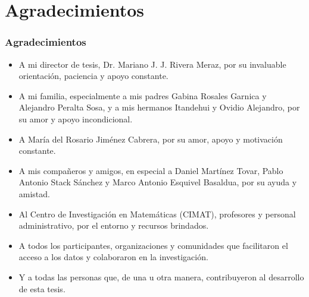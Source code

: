 
\section{Agradecimientos}

\begin{frame}
\frametitle{Agradecimientos}
\begin{itemize}
    \item A mi director de tesis, Dr. Mariano J. J. Rivera Meraz, por su invaluable orientación, paciencia y apoyo constante.
    \item A mi familia, especialmente a mis padres Gabina Rosales Garnica y Alejandro Peralta Sosa, y a mis hermanos Itandehui y Ovidio Alejandro, por su amor y apoyo incondicional.
    \item A María del Rosario Jiménez Cabrera, por su amor, apoyo y motivación constante.
    \item A mis compañeros y amigos, en especial a Daniel Martínez Tovar, Pablo Antonio Stack Sánchez y Marco Antonio Esquivel Basaldua, por su ayuda y amistad.
    \item Al Centro de Investigación en Matemáticas (CIMAT), profesores y personal administrativo, por el entorno y recursos brindados.
    \item A todos los participantes, organizaciones y comunidades que facilitaron el acceso a los datos y colaboraron en la investigación.
    \item Y a todas las personas que, de una u otra manera, contribuyeron al desarrollo de esta tesis.
\end{itemize}
\end{frame}
